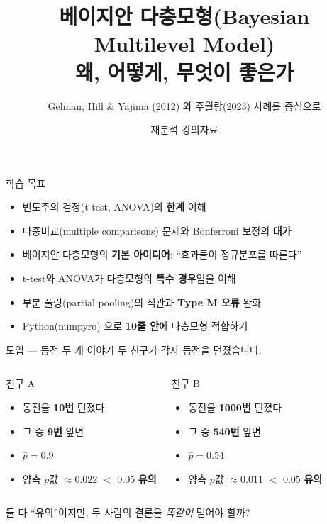 \documentclass[aspectratio=169, 11pt]{beamer}
\title[Bayesian Multilevel Model]{베이지안 다층모형(Bayesian Multilevel Model)\\왜, 어떻게, 무엇이 좋은가}
\subtitle{Gelman, Hill \& Yajima (2012) 와 주월랑(2023) 사례를 중심으로}
\author{재분석 강의자료}
\institute{}
\date{}
\begin{document}
\begin{frame}
\titlepage
\end{frame}

\begin{frame}{학습 목표}
\begin{itemize}
\item 빈도주의 검정(t-test, ANOVA)의 \textbf{한계} 이해
\item 다중비교(multiple comparisons) 문제와 Bonferroni 보정의 \textbf{대가}
\item 베이지안 다층모형의 \textbf{기본 아이디어}: ``효과들이 정규분포를 따른다''
\item t-test와 ANOVA가 다층모형의 \textbf{특수 경우}임을 이해
\item 부분 풀링(partial pooling)의 직관과 \textbf{Type M 오류} 완화
\item Python(numpyro) 으로 \textbf{10줄 안에} 다층모형 적합하기
\end{itemize}
\end{frame}

\begin{frame}{도입 — 동전 두 개 이야기}
두 친구가 각자 동전을 던졌습니다.
\vspace{0.4cm}
\begin{columns}
\begin{block}{친구 A}
\begin{itemize}
\item 동전을 \textbf{10번} 던졌다
\item 그 중 \textbf{9번} 앞면
\item $\hat p = 0.9$
\item 양측 $p$값 $\approx 0.022$ $<$ 0.05 \textbf{유의}
\end{itemize}
\end{block}
\begin{block}{친구 B}
\begin{itemize}
\item 동전을 \textbf{1000번} 던졌다
\item 그 중 \textbf{540번} 앞면
\item $\hat p = 0.54$
\item 양측 $p$값 $\approx 0.011$ $<$ 0.05 \textbf{유의}
\end{itemize}
\end{block}
\end{columns}
\vspace{0.4cm}
\centering
\large 둘 다 ``유의''이지만, 두 사람의 결론을 \emph{똑같이} 믿어야 할까?
\end{frame}
\end{document}
